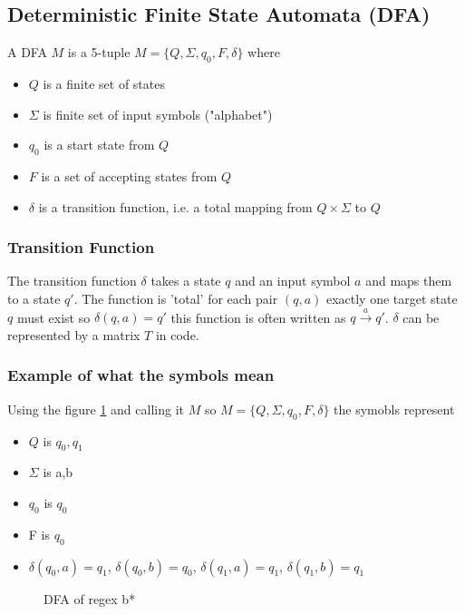 \subsection{Deterministic Finite State Automata (DFA)}
A DFA $M$ is  a 5-tuple $M= \{Q,\Sigma,q_0,F,\delta\}$ where 
\begin{itemize}
    \item $Q$ is a finite set of states
    \item $\Sigma$ is finite set of input symbols ("alphabet")
    \item $q_0$ is a start state from $Q$
    \item $F$ is a set of accepting states from $Q$
    \item $\delta$ is a transition function, i.e. a total mapping from $Q\times\Sigma$ to $Q$
\end{itemize}
\subsubsection{Transition Function}
The transition function $\delta$ takes a state $q$ and an input symbol $a$ and maps them to a state $q'$. The function is 'total' for each pair $(q,a)$ exactly one target state $q$ must exist so $\delta(q,a)=q'$ this function is often written as $q \xrightarrow{a}q'$. $\delta$ can be represented by a matrix $T$ in code.
\subsubsection{Example of what the symbols mean}
Using the figure \ref{fig:DFAB*} and calling it $M$ so $M= \{Q,\Sigma,q_0,F,\delta\}$ the symobls represent
\begin{itemize}
    \item $Q$ is $q_0,q_1$
    \item $\Sigma$ is a,b
    \item $q_0$ is $q_0$
    \item F is $q_0$
    \item $\delta(q_0,a) = q_1$, $\delta(q_0,b) = q_0$, $\delta(q_1,a) = q_1$, $\delta(q_1,b) = q_1$
\end{itemize}
\begin{figure}[H]
    \centering
    \caption{DFA of regex b*}
    \label{fig:DFAB*}
\end{figure}
